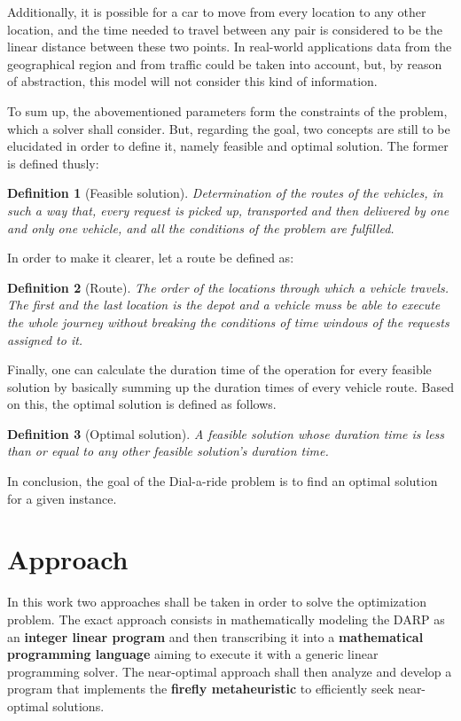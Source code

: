 \documentclass[tuberlin,cic,tc,openright,english,noabntcite,oneside]{iiufrgs}
\newtheorem{definition}{Definition}
\begin{document}
Additionally, it is possible for a car to move from every location to any other location, and the time needed to travel between any pair is considered to be the linear distance between these two points. In real-world applications data from the geographical region and from traffic could be taken into account, but, by reason of abstraction, this model will not consider this kind of information.

To sum up, the abovementioned parameters form the constraints of the problem, which a solver shall consider. But, regarding the goal, two concepts are still to be elucidated in order to define it, namely feasible and optimal solution. The former is defined thusly:
\begin{definition}[Feasible solution]
Determination of the routes of the vehicles, in such a way that, every request is picked up, transported and then delivered by one and only one vehicle, and all the conditions of the problem are fulfilled.
\end{definition}

In order to make it clearer, let a route be defined as:
\begin{definition}[Route]
The order of the locations through which a vehicle travels. The first and the last location is the depot and a vehicle muss be able to execute the whole journey without breaking the conditions of time windows of the requests assigned to it.
\end{definition}

Finally, one can calculate the duration time of the operation for every feasible solution by basically summing up the duration times of every vehicle route. Based on this, the optimal solution is defined as follows.
\begin{definition}[Optimal solution]
A feasible solution whose duration time is less than or equal to any other feasible solution's duration time.
\end{definition}

In conclusion, the goal of the Dial-a-ride problem is to find an optimal solution for a given instance.

\section{Approach}
In this work two approaches shall be taken in order to solve the optimization problem. The exact approach consists in mathematically modeling the DARP as an \textbf{integer linear program} and then transcribing it into a \textbf{mathematical programming language} aiming to execute it with a generic linear programming solver. The near-optimal approach shall then analyze and develop a program that implements the \textbf{firefly metaheuristic} to efficiently seek near-optimal solutions.
\end{document}
